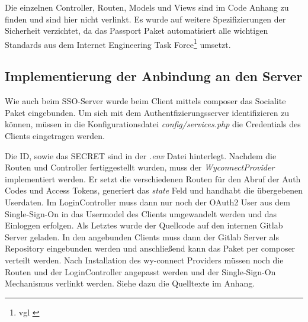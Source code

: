 Die einzelnen Controller, Routen, Models und Views sind im Code Anhang zu finden und sind hier nicht verlinkt. Es wurde auf weitere Spezifizierungen der Sicherheit verzichtet, da das Passport Paket automatisiert alle wichtigen Standards aus dem Internet Engineering Task Force\footnote{vgl \cite{OAuth2}} umsetzt.

\subsection{Implementierung der Anbindung an den Server}
\label{sec:ImplementierungCient}

Wie auch beim SSO-Server wurde beim Client mittels composer das Socialite Paket eingebunden. Um sich mit dem Authentfizierungsserver identifizieren zu können, müssen in die Konfigurationsdatei \textit{config/services.php} die Credentials des Clients eingetragen werden. 

Die ID, sowie das SECRET sind in der \textit{.env} Datei hinterlegt. Nachdem die Routen und Controller fertiggestellt wurden, muss der \textit{WyconnectProvider} implementiert werden. Er setzt die verschiedenen Routen für den Abruf der Auth Codes und Access Tokens, generiert das \textit{state} Feld und handhabt die übergebenen Userdaten. 
Im LoginController muss dann nur noch der OAuth2 User aus dem Single-Sign-On in das Usermodel des Clients umgewandelt werden und das Einloggen erfolgen. 
Als Letztes wurde der Quellcode auf den internen Gitlab Server geladen. In den angebunden Clients muss dann der Gitlab Server als Repository eingebunden werden und anschließend kann das Paket per composer verteilt werden. 
Nach Installation des wy-connect Providers müssen noch die Routen und der LoginController angepasst werden und der Single-Sign-On Mechanismus verlinkt werden. Siehe dazu die Quelltexte im Anhang. 

